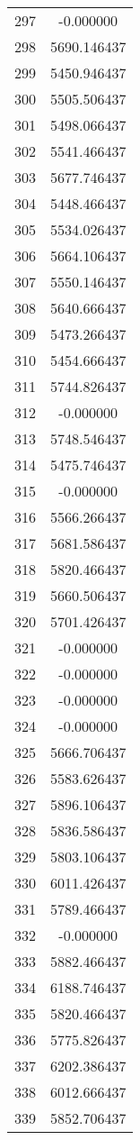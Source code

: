 \documentclass[12pt]{article}
\begin{document}
\begin{longtable}{@{}cc@{}}
297 & -0.000000 \\
298 & 5690.146437 \\
299 & 5450.946437 \\
300 & 5505.506437 \\
301 & 5498.066437 \\
302 & 5541.466437 \\
303 & 5677.746437 \\
304 & 5448.466437 \\
305 & 5534.026437 \\
306 & 5664.106437 \\
307 & 5550.146437 \\
308 & 5640.666437 \\
309 & 5473.266437 \\
310 & 5454.666437 \\
311 & 5744.826437 \\
312 & -0.000000 \\
313 & 5748.546437 \\
314 & 5475.746437 \\
315 & -0.000000 \\
316 & 5566.266437 \\
317 & 5681.586437 \\
318 & 5820.466437 \\
319 & 5660.506437 \\
320 & 5701.426437 \\
321 & -0.000000 \\
322 & -0.000000 \\
323 & -0.000000 \\
324 & -0.000000 \\
325 & 5666.706437 \\
326 & 5583.626437 \\
327 & 5896.106437 \\
328 & 5836.586437 \\
329 & 5803.106437 \\
330 & 6011.426437 \\
331 & 5789.466437 \\
332 & -0.000000 \\
333 & 5882.466437 \\
334 & 6188.746437 \\
335 & 5820.466437 \\
336 & 5775.826437 \\
337 & 6202.386437 \\
338 & 6012.666437 \\
339 & 5852.706437 \\

\end{longtable}
\end{document}
